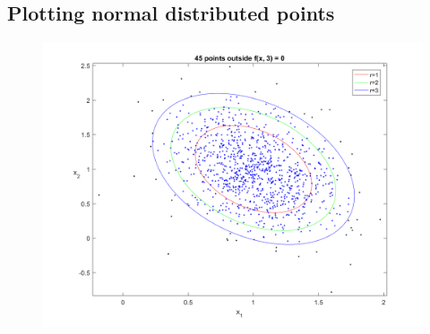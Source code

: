 \documentclass[a4paper,11pt]{article}
\begin{document}
\subsection{Plotting normal distributed points}
\begin{figure}[h]
  \begin{center}
    \includegraphics[width=\textwidth]{P2_1}
    \caption{}
    \label{fig:}
  \end{center}
\end{figure}
\clearpage
\end{document}
